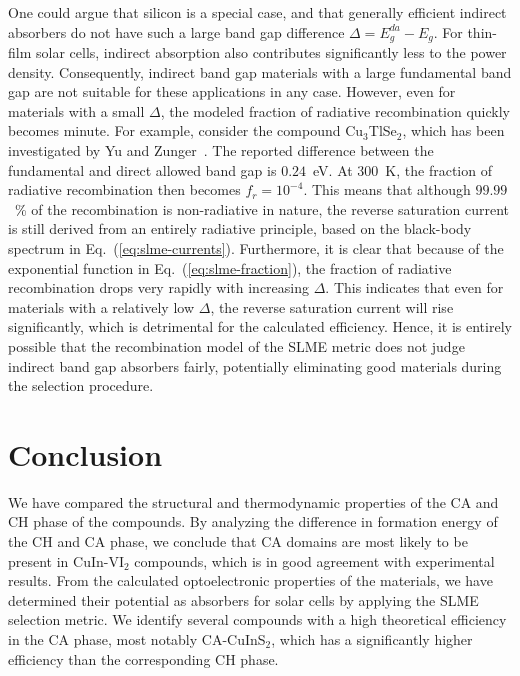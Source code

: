 \begin{refsection}
One could argue that silicon is a special case, and that generally efficient indirect absorbers do not have such a large band gap difference \mbox{$\Delta = E_g ^{da}- E_g$}. For thin-film solar cells, indirect absorption also contributes significantly less to the power density. Consequently, indirect band gap materials with a large fundamental band gap are not suitable for these applications in any case. However, even for materials with a small $\Delta$, the modeled fraction of radiative recombination quickly becomes minute. For example, consider the compound Cu$_3$TlSe$_2$, which has been investigated by Yu and Zunger~\cite{Yu2012}. The reported difference between the fundamental and direct allowed band gap is $0.24$~\si{\electronvolt}. At 300~\si{\kelvin}, the fraction of radiative recombination then becomes \mbox{$f_r = 10^{-4}$}. This means that although $99.99$~\% of the recombination is non-radiative in nature, the reverse saturation current is still derived from an entirely radiative principle, based on the black-body spectrum in Eq.~(\ref{eq:slme-currents}). Furthermore, it is clear that because of the exponential function in Eq.~(\ref{eq:slme-fraction}), the fraction of radiative recombination drops very rapidly with increasing $\Delta$. This indicates that even for materials with a relatively low $\Delta$, the reverse saturation current will rise significantly, which is detrimental for the calculated efficiency. Hence, it is entirely possible that the recombination model of the SLME metric does not judge indirect band gap absorbers fairly, potentially eliminating good materials during the selection procedure.\\

\section{Conclusion}

We have compared the structural and thermodynamic properties of the CA and CH phase of the compounds. By analyzing the difference in formation energy of the CH and CA phase, we conclude that CA domains are most likely to be present in \mbox{CuIn-VI$_2$} compounds, which is in good agreement with experimental results. From the calculated optoelectronic properties of the materials, we have determined their potential as absorbers for solar cells by applying the SLME selection metric. We identify several compounds with a high theoretical efficiency in the CA phase, most notably \mbox{CA-CuInS$_2$}, which has a significantly higher efficiency than the corresponding CH phase.


\end{refsection}
